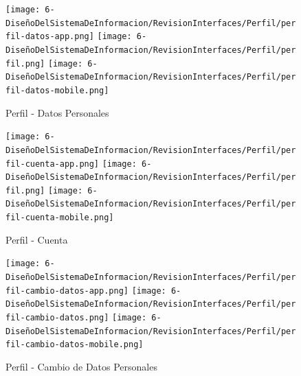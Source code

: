 \begin{figure}[H]
	\centering
	\texttt{[image: 6-DiseñoDelSistemaDeInformacion/RevisionInterfaces/Perfil/perfil-datos-app.png]}
	\texttt{[image: 6-DiseñoDelSistemaDeInformacion/RevisionInterfaces/Perfil/perfil.png]}
	\texttt{[image: 6-DiseñoDelSistemaDeInformacion/RevisionInterfaces/Perfil/perfil-datos-mobile.png]}
	\caption{Perfil - Datos Personales}
\end{figure}

\begin{figure}[H]
	\centering
	\texttt{[image: 6-DiseñoDelSistemaDeInformacion/RevisionInterfaces/Perfil/perfil-cuenta-app.png]}
	\texttt{[image: 6-DiseñoDelSistemaDeInformacion/RevisionInterfaces/Perfil/perfil.png]}
	\texttt{[image: 6-DiseñoDelSistemaDeInformacion/RevisionInterfaces/Perfil/perfil-cuenta-mobile.png]}
	\caption{Perfil - Cuenta}
\end{figure}

\begin{figure}[H]
	\centering
	\texttt{[image: 6-DiseñoDelSistemaDeInformacion/RevisionInterfaces/Perfil/perfil-cambio-datos-app.png]}
	\texttt{[image: 6-DiseñoDelSistemaDeInformacion/RevisionInterfaces/Perfil/perfil-cambio-datos.png]}
	\texttt{[image: 6-DiseñoDelSistemaDeInformacion/RevisionInterfaces/Perfil/perfil-cambio-datos-mobile.png]}
	\caption{Perfil - Cambio de Datos Personales}
\end{figure}

